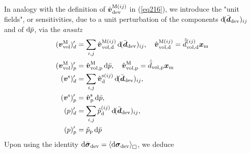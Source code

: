 \documentclass[10pt,a4paper]{article}
\newcommand{\ded}{\mathrm{d}}
\newcommand{\dep}{\mathrm{p}}
\begin{document}
In analogy with the definition of $\hat{\boldsymbol{v}}^{\mathrm{M}(ij)}_{\mathrm{dev}}$
in (\ref{eq216}), we introduce the "unit fields", or sensitivities, due to a unit perturbation of the components $\operatorname{d \!}(\bar{\boldsymbol{d}}_{\mathrm{dev}})_{ij}$ and of $\operatorname{d \!}\bar{p}$, via the \emph{ansatz}
\begin{align}
    (\ta{v}^\macro_\vol)'_d
    & = 
    \sum_{i,j}\hat{\ta{v}}^{\macro(ij)}_{\vol,\ded} \dif(\bar{\ts d}_\dev)_{ij}, \quad
    \hat{\ta{v}}^{\macro(ij)}_{\vol,\ded} = \hat{\bar{d}}^{(ij)}_{\vol,\ded}\ta{x}_\mean
\label{eq221a} \\
    (\ta{v}^\macro_\vol)'_p
    & = 
    \hat{\ta{v}}^{\macro}_{\vol,\dep} \dif\bar{p}, \quad
    \hat{\ta{v}}^{\macro}_{\vol,\dep} = \hat{\bar{d}}_{\vol,\dep}\ta{x}_\mean
\label{eq221b} \\
    (\ta{v}^\fluct)'_d
    & = 
    \sum_{i,j}\hat{\ta{v}}^{\fluct(ij)}_\ded\dif(\bar{\ts d}_\dev)_{ij},
\label{eq222a} \\
    (\ta{v}^\fluct)'_p
    & = 
    \hat{\ta{v}}^{\fluct}_\dep\dif\bar{p},
\label{eq222b} \\
    (p)'_d
    & = 
    \sum_{i,j}\hat{p}^{(ij)}_\ded\dif(\bar{\ts d}_\dev)_{ij},
\label{eq223a} \\
    (p)'_p
    & = 
    \hat{p}_\dep\dif\bar{p}
\label{eq223b}
\end{align}
Upon using the identity $\operatorname{d \!}\bar{\boldsymbol{\sigma}}_{\mathrm{dev}}=\left\langle \operatorname{d \!}\boldsymbol{\sigma}_{\mathrm{dev}}\right\rangle_\Box$, we deduce
\end{document}
